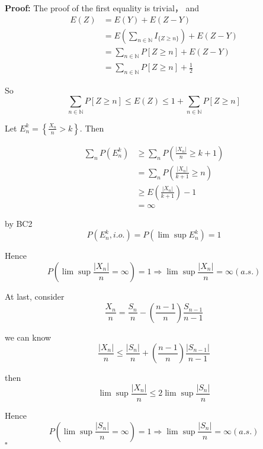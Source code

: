 \documentclass[UTF8, 12pt]{article}
\newenvironment{proof}{\noindent\ignorespaces\textbf{Proof:}}{\hfill $\square$\par\noindent}
\theoremstyle{break}
\begin{document}
    \begin{proof}
        The proof of the first equality is trivial， and
        \begin{align*}
            E(Z) 
            &= E(Y) + E(Z - Y) \\
            &= E\left(\sum_{n\in \mathbb{N}} I_{\{Z\geq n\}}\right) + E(Z-Y) \\
            &= \sum_{n\in \mathbb{N}} P[Z \geq n] +  E(Z-Y) \\
            &= \sum_{n\in \mathbb{N}} P[Z \geq n] + \frac 1 2
        \end{align*}

        So $$
        \sum_{n\in \mathbb{N}}P[Z\geq n]\leq E(Z) \leq 1 + \sum_{n\in\mathbb{N}}P[Z\geq n]
        $$

        Let 
        $E_n^k = \left\{ \frac {X_n} n > k \right\}$. Then 

        \begin{align*}
            \sum_n P(E_n^k) 
            &\geq \sum_n P\left(\frac {|X_n|} n \geq k + 1 \right) \\
            &= \sum_n P\left(\frac {|X_n|} {k+1} \geq n \right) \\
            &\geq E\left(\frac {|X_n|} {k+1}\right) - 1 \\
            &= \infty
        \end{align*}

        by BC2
        $$
        P(E_n^k,i.o.) = P(\lim\sup E_n^k) = 1
        $$

        Hence 
        $$
        P(\lim \sup \frac {|X_n|} n = \infty) = 1 \Rightarrow \lim \sup \frac {|X_n|} n = \infty (a.s.)
        $$

        At last, consider
        $$
        \frac {X_n} n = \frac {S_n} n - \left(\frac {n-1} n\right) \frac {S_{n-1}} {n-1}
        $$
        
        we can know
        $$
        \frac {|X_n|} n \leq \frac {|S_n|} n + \left(\frac {n-1} n\right) \frac {|S_{n-1}|} {n-1}
        $$
        
        then
        $$
        \lim\sup\frac {|X_n|}{n} \leq 2 \lim\sup \frac{|S_n|}n
        $$

        Hence
        $$
        P(\lim \sup \frac {|S_n|} n = \infty) = 1 \Rightarrow \lim \sup \frac {|S_n|} n = \infty (a.s.)
        $$
    \end{proof}
\end{document}
